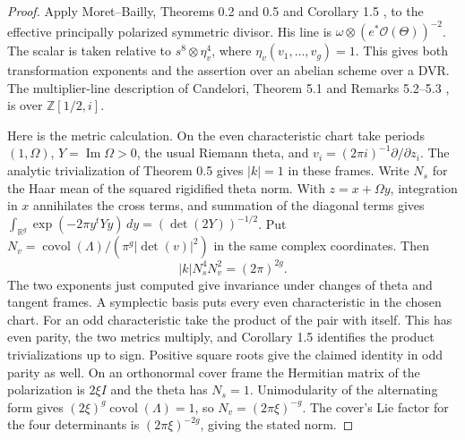 \begin{proof}
Apply Moret--Bailly, Theorems 0.2 and 0.5 and Corollary 1.5
\cite{moret-bailly-key}, to the effective principally polarized
symmetric divisor. His line is
\(\omega\otimes(e^*\mathcal O(\Theta))^{-2}\).
The scalar is taken relative to \(s^8\otimes\eta_v^4\), where
\(\eta_v(v_1,\ldots,v_g)=1\). This gives both transformation
exponents and the assertion over an abelian scheme over a DVR.
The multiplier-line description of Candelori, Theorem 5.1 and
Remarks 5.2--5.3 \cite{candelori-key}, is over
\(\mathbb Z[1/2,i]\).

Here is the metric calculation. On the even characteristic chart
take periods \((1,\Omega)\), \(Y=\operatorname{Im}\Omega>0\),
the usual Riemann theta, and
\(v_i=(2\pi i)^{-1}\partial/\partial z_i\). The analytic
trivialization of Theorem 0.5 gives \(|k|=1\) in these frames.
Write \(N_s\) for the Haar mean of the squared rigidified theta
norm. With \(z=x+\Omega y\), integration in \(x\) annihilates the
cross terms, and summation of the diagonal terms gives
\(\int_{\mathbb R^g}\exp(-2\pi y^tYy)\,dy=(\det(2Y))^{-1/2}\).
Put \(N_v=\operatorname{covol}(\Lambda)/
(\pi^g|\det(v)|^2)\) in the same complex coordinates. Then
\[
 |k|N_s^4 N_v^2=(2\pi)^{2g}.
\]
The two exponents just computed give invariance under changes of
theta and tangent frames. A symplectic basis puts every even
characteristic in the chosen chart. For an odd characteristic take
the product of the pair with itself. This has even parity, the
two metrics multiply, and Corollary 1.5 identifies the product
trivializations up to sign. Positive square roots give the claimed
identity in odd parity as well. On an orthonormal cover frame the
Hermitian matrix of the polarization is \(2\xi I\) and the theta
has \(N_s=1\). Unimodularity of the alternating form gives
\((2\xi)^g\operatorname{covol}(\Lambda)=1\), so
\(N_v=(2\pi\xi)^{-g}\). The cover's Lie factor for the four
determinants is \((2\pi\xi)^{-2g}\), giving the stated norm.
\end{proof}

